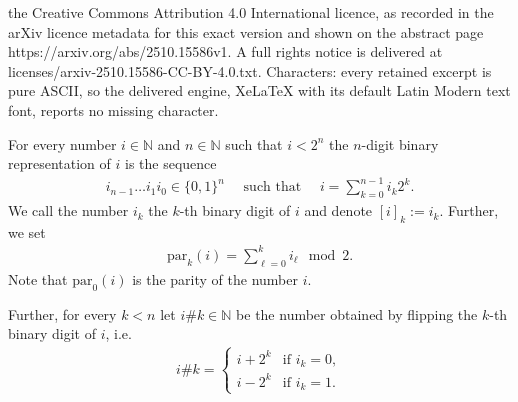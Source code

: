 \documentclass[10pt,a4paper]{amsart}
\newcommand{\N}{\mathbb{N}}
\begin{document}
the Creative Commons Attribution 4.0 International licence, as recorded in the arXiv licence metadata for this exact version and shown on the abstract page https://arxiv.org/abs/2510.15586v1. A full rights notice is delivered at licenses/arxiv-2510.15586-CC-BY-4.0.txt. Characters: every retained excerpt is pure ASCII, so the delivered engine, XeLaTeX with its default Latin Modern text font, reports no missing character.
\begin{notation}
    \label{pre::notation:binary_numbers}
    For every number $i \in \N$ and $n \in \N$ such that $i < 2^n$ the $n$-digit binary representation of $i$ is the sequence 
    \begin{align*}
        i_{n-1} \dots i_1 i_0 \in \{0,1\}^n \quad \text{ such that } \quad i = \sum_{k=0}^{n-1} i_k 2^{k}.
    \end{align*}
    We call the number $i_k$ the $k$-th binary digit of $i$ and denote $[i]_k := i_k$. Further, we set
    \begin{align*}
        \mathrm{par}_k(i) = \sum_{\ell=0}^{k} i_\ell \mod 2.
    \end{align*}
    Note that $\mathrm{par}_0(i)$ is the parity of the number $i$.

    Further, for every $k < n$ let $i \# k \in \N$ be the number obtained by flipping the $k$-th binary digit of $i$, i.e. 
    \begin{align*}
        i \# k = \begin{cases}
            i + 2^{k} & \text{if } i_k = 0, \\
            i - 2^{k} & \text{if } i_k = 1.
        \end{cases}
    \end{align*}
\end{notation}
\end{document}
